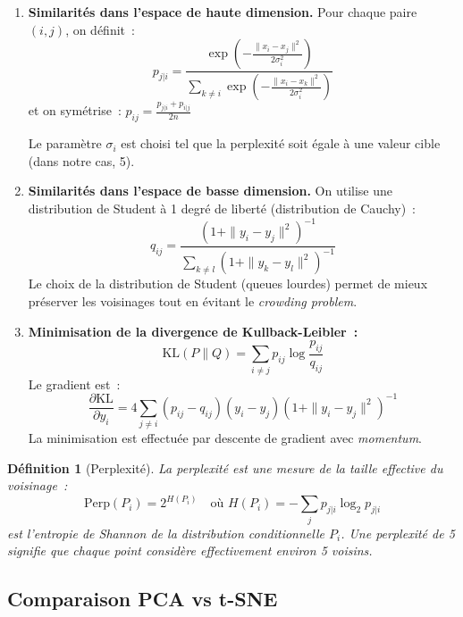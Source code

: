 \documentclass[12pt,a4paper]{article}
\newtheorem{definition}{Définition}[section]
\begin{document}
\begin{enumerate}
    \item \textbf{Similarités dans l'espace de haute dimension.} Pour chaque paire $(i, j)$, on définit~:
    \[
        p_{j|i} = \frac{\exp\left(-\frac{\|x_i - x_j\|^2}{2\sigma_i^2}\right)}{\sum_{k \neq i} \exp\left(-\frac{\|x_i - x_k\|^2}{2\sigma_i^2}\right)}
    \]
    et on symétrise~: $p_{ij} = \frac{p_{j|i} + p_{i|j}}{2n}$

    Le paramètre $\sigma_i$ est choisi tel que la perplexité soit égale à une valeur cible (dans notre cas, 5).

    \item \textbf{Similarités dans l'espace de basse dimension.} On utilise une distribution de Student à 1 degré de liberté (distribution de Cauchy)~:
    \[
        q_{ij} = \frac{(1 + \|y_i - y_j\|^2)^{-1}}{\sum_{k \neq l} (1 + \|y_k - y_l\|^2)^{-1}}
    \]
    Le choix de la distribution de Student (queues lourdes) permet de mieux préserver les voisinages tout en évitant le \emph{crowding problem}.

    \item \textbf{Minimisation de la divergence de Kullback-Leibler~:}
    \[
        \text{KL}(P \| Q) = \sum_{i \neq j} p_{ij} \log \frac{p_{ij}}{q_{ij}}
    \]
    Le gradient est~:
    \[
        \frac{\partial \text{KL}}{\partial y_i} = 4 \sum_{j \neq i} (p_{ij} - q_{ij})(y_i - y_j)(1 + \|y_i - y_j\|^2)^{-1}
    \]
    La minimisation est effectuée par descente de gradient avec \emph{momentum}.
\end{enumerate}

\begin{definition}[Perplexité]
La \emph{perplexité} est une mesure de la taille effective du voisinage~:
\[
    \text{Perp}(P_i) = 2^{H(P_i)} \quad \text{où } H(P_i) = -\sum_j p_{j|i} \log_2 p_{j|i}
\]
est l'entropie de Shannon de la distribution conditionnelle $P_i$. Une perplexité de 5 signifie que chaque point considère effectivement environ 5 voisins.
\end{definition}

\subsection{Comparaison PCA vs t-SNE}
\end{document}
